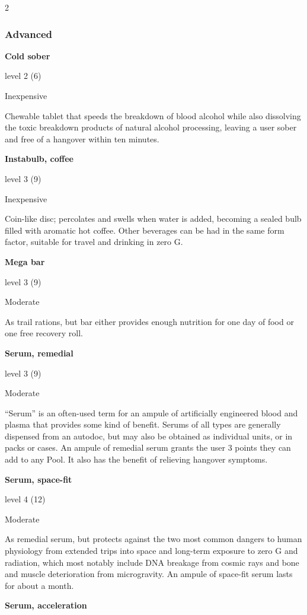 \begin{multicols}{2}
\subsubsection{Advanced}

\textbf{Cold sober} 

level 2 (6) 

Inexpensive 

Chewable tablet that speeds the breakdown of blood alcohol while also dissolving the toxic breakdown products of natural alcohol processing, leaving a user sober and free of a hangover within ten minutes. 

\textbf{Instabulb, coffee} 

level 3 (9) 

Inexpensive 

Coin-like disc; percolates and swells when water is added, becoming a sealed bulb filled with aromatic hot coffee. Other beverages can be had in the same form factor, suitable for travel and drinking in zero G. 

\textbf{Mega bar} 

level 3 (9) 

Moderate 

As trail rations, but bar either provides enough nutrition for one day of food or one free recovery roll. 

\textbf{Serum, remedial} 

level 3 (9) 

Moderate 

“Serum” is an often-used term for an ampule of artificially engineered blood and plasma that provides some kind of benefit. Serums of all types are generally dispensed from an autodoc, but may also be obtained as individual units, or in packs or cases. An ampule of remedial serum grants the user 3 points they can add to any Pool. It also has the benefit of relieving hangover symptoms. 

\textbf{Serum, space-fit} 

level 4 (12) 

Moderate 

As remedial serum, but protects against the two most common dangers to human physiology from extended trips into space and long-term exposure to zero G and radiation, which most notably include DNA breakage from cosmic rays and bone and muscle deterioration from microgravity. An ampule of space-fit serum lasts for about a month.

\textbf{Serum, acceleration} 


\end{multicols}
